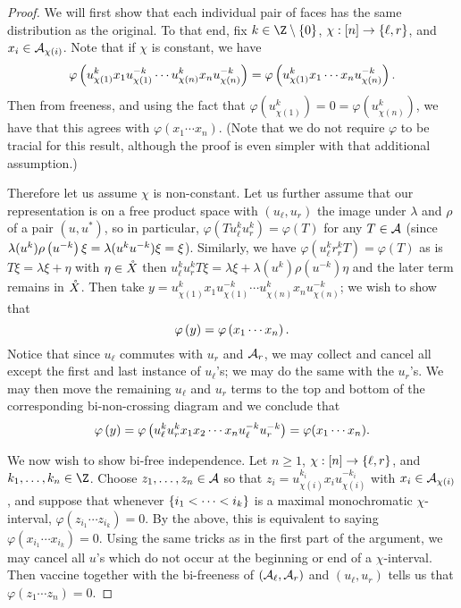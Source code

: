 \begin{proof}
	We will first show that each individual pair of faces has the same distribution as the original.
	To that end, fix $k \in \Z\setminus\set0$, $\chi : [n] \to \left\{\ell, r\right\}$, and $x_i \in \mathcal{A}_{\chi(i)}$.
	Note that if $\chi$ is constant, we have
	$$\varphi\left(u_{\chi(1)}^k x_1 u_{\chi(1)}^{-k} \cdots u_{\chi(n)}^k x_n u_{\chi(n)}^{-k}\right) = \varphi\left(u_{\chi(1)}^k x_1\cdots x_n u_{\chi(n)}^{-k}\right).$$
	Then from freeness, and using the fact that $\varphi(u_{\chi(1)}^k) = 0 = \varphi(u_{\chi(n)}^k)$, we have that this agrees with $\varphi(x_1\cdots x_n)$.
	(Note that we do not require $\varphi$ to be tracial for this result, although the proof is even simpler with that additional assumption.)

	Therefore let us assume $\chi$ is non-constant.
	Let us further assume that our representation is on a free product space with $(u_\ell, u_r)$ the image under $\lambda$ and $\rho$ of a pair $(u, u^*)$, so in particular, $\varphi(Tu_\ell^{k}u_r^{k}) = \varphi(T)$ for any $T \in \mathcal{A}$ (since $\lambda(u^k)\rho\left(u^{-k}\right)\xi = \lambda(u^ku^{-k})\xi = \xi$).
	Similarly, we have $\varphi(u_\ell^k r_r^k T) = \varphi(T)$ as is $T\xi = \lambda\xi + \eta$ with $\eta \in \mathring{X}$ then $u_\ell^k u_r^k T\xi = \lambda\xi + \lambda(u^k)\rho(u^{-k})\eta$ and the later term remains in $\mathring{X}$.
	Then take $y = u_{\chi(1)}^k x_1 u_{\chi(1)}^{-k} \cdots u_{\chi(n)}^k x_n u_{\chi(n)}^{-k}$; we wish to show that
	$$\varphi\left(y\right) = \varphi\left(x_1\cdots x_n\right).$$
	Notice that since $u_{\ell}$ commutes with $u_r$ and $\mathcal{A}_r$, we may collect and cancel all except the first and last instance of $u_\ell$'s; we may do the same with the $u_r$'s.
	We may then move the remaining $u_\ell$ and $u_r$ terms to the top and bottom of the corresponding bi-non-crossing diagram and we conclude that 
	$$\varphi\left(y\right) = \varphi\left(u_{\ell}^ku_r^k x_1x_2\cdots x_n u_\ell^{-k}u_r^{-k}\right) = \varphi(x_1\cdots x_n).$$

	We now wish to show bi-free independence.
	Let $n \geq 1$, $\chi : [n] \to \left\{\ell, r\right\}$, and $k_1, \ldots, k_n \in \Z$.
	Choose $z_1, \ldots, z_n \in \mathcal{A}$ so that $z_i = u_{\chi(i)}^{k_i} x_i u_{\chi(i)}^{-k_i}$ with $x_i \in \mathcal{A}_{\chi(i)}$, and suppose that whenever $\left\{i_1 < \cdots < i_k\right\}$ is a maximal monochromatic $\chi$-interval, $\varphi(z_{i_1}\cdots z_{i_k}) = 0$.
	By the above, this is equivalent to saying $\varphi(x_{i_1}\cdots x_{i_k}) = 0$.
	Using the same tricks as in the first part of the argument, we may cancel all $u$'s which do not occur at the beginning or end of a $\chi$-interval.
	Then vaccine together with the bi-freeness of $(\mathcal{A}_\ell, \mathcal{A}_r)$ and $(u_\ell, u_r)$ tells us that $\varphi(z_1\cdots z_n) = 0$.
\end{proof}

